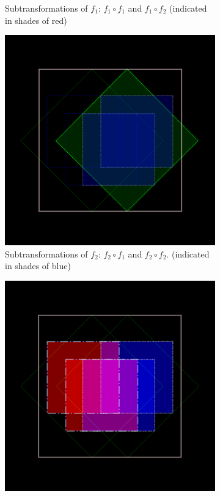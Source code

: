 \documentclass[11pt]{article}
\begin{document}
\begin{enumerate}
\begin{figure}
\begin{subfigure}[b]{0.4\textwidth}
         \caption{Subtransformations of $f_1$: $f_1 \circ f_1$ and $f_1 \circ f_2$ (indicated in shades of red)}
         \label{figure:dragon_curve_b}
     \end{subfigure}
     \hfill
     \begin{subfigure}[b]{0.4\textwidth}
         \centering
         \includegraphics[width=\textwidth]{figures/dragon_curve_c}
         \caption{Subtransformations of $f_2$: $f_2 \circ f_1$ and $f_2 \circ f_2$. (indicated in shades of blue)}
         \label{figure:dragon_curve_c}
     \end{subfigure}
     \hfill
     \begin{subfigure}[b]{0.4\textwidth}
         \centering
         \includegraphics[width=\textwidth]{figures/dragon_curve_d}

\end{subfigure}
\end{figure}
\end{enumerate}
\end{document}
